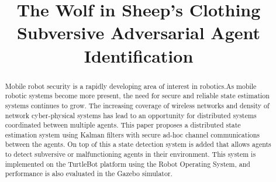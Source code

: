 \documentclass[conference]{IEEEtran}
\begin{document}
%
\title{The Wolf in Sheep's Clothing\\
Subversive Adversarial Agent Identification}


\author{
}



\maketitle

\begin{abstract}
Mobile robot security is a rapidly developing area of interest in robotics.As mobile robotic systems become more present, the need for secure and reliable state estimation systems continues to grow. The increasing coverage of wireless networks and density of network cyber-physical systems has lead to an opportunity for distributed systems coordinated between multiple agents. This paper proposes a distributed state estimation system using Kalman filters with secure ad-hoc channel communications between the agents. On top of this a state detection system is added that allows agents to detect subversive or malfunctioning agents in their environment. This system is implemented on the TurtleBot platform using the Robot Operating System, and performance is also evaluated in the Gazebo simulator.
\end{abstract}
\end{document}
